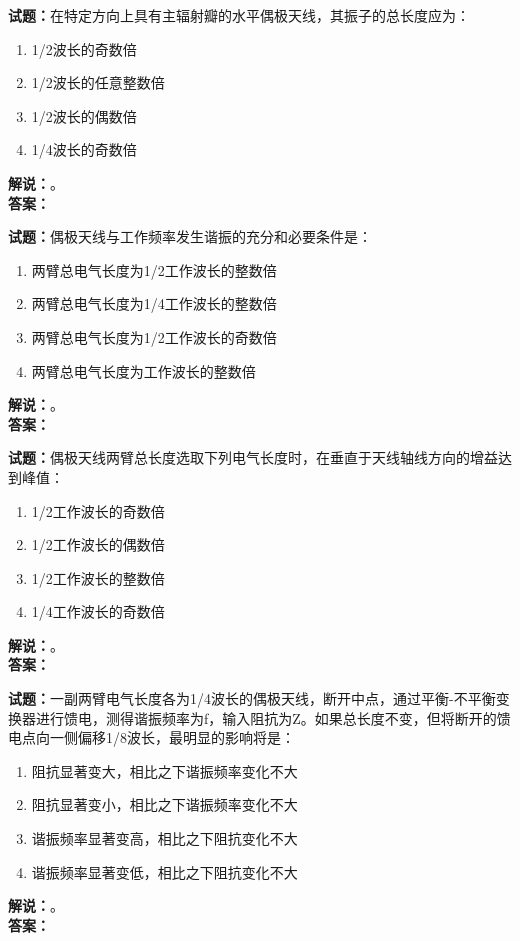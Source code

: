\documentclass{ctexbook}
\begin{document}
\vspace{\baselineskip}

\noindent\textbf{试题：}在特定方向上具有主辐射瓣的水平偶极天线，其振子的总长度应为：
\begin{enumerate}[leftmargin=3em]
  \item 1/2波长的奇数倍
  \item 1/2波长的任意整数倍
  \item 1/2波长的偶数倍
  \item 1/4波长的奇数倍
\end{enumerate}
\noindent\textbf{解说：}\textbf{}。\\\noindent\textbf{答案：}

\vspace{\baselineskip}

\noindent\textbf{试题：}偶极天线与工作频率发生谐振的充分和必要条件是：
\begin{enumerate}[leftmargin=3em]
  \item 两臂总电气长度为1/2工作波长的整数倍
  \item 两臂总电气长度为1/4工作波长的整数倍
  \item 两臂总电气长度为1/2工作波长的奇数倍
  \item 两臂总电气长度为工作波长的整数倍
\end{enumerate}
\noindent\textbf{解说：}\textbf{}。\\\noindent\textbf{答案：}

\vspace{\baselineskip}

\noindent\textbf{试题：}偶极天线两臂总长度选取下列电气长度时，在垂直于天线轴线方向的增益达到峰值：
\begin{enumerate}[leftmargin=3em]
  \item 1/2工作波长的奇数倍
  \item 1/2工作波长的偶数倍
  \item 1/2工作波长的整数倍
  \item 1/4工作波长的奇数倍
\end{enumerate}
\noindent\textbf{解说：}\textbf{}。\\\noindent\textbf{答案：}

\vspace{\baselineskip}

\noindent\textbf{试题：}一副两臂电气长度各为1/4波长的偶极天线，断开中点，通过平衡-不平衡变换器进行馈电，测得谐振频率为f，输入阻抗为Z。如果总长度不变，但将断开的馈电点向一侧偏移1/8波长，最明显的影响将是：
\begin{enumerate}[leftmargin=3em]
  \item 阻抗显著变大，相比之下谐振频率变化不大
  \item 阻抗显著变小，相比之下谐振频率变化不大
  \item 谐振频率显著变高，相比之下阻抗变化不大
  \item 谐振频率显著变低，相比之下阻抗变化不大
\end{enumerate}
\noindent\textbf{解说：}\textbf{}。\\\noindent\textbf{答案：}
\end{document}
